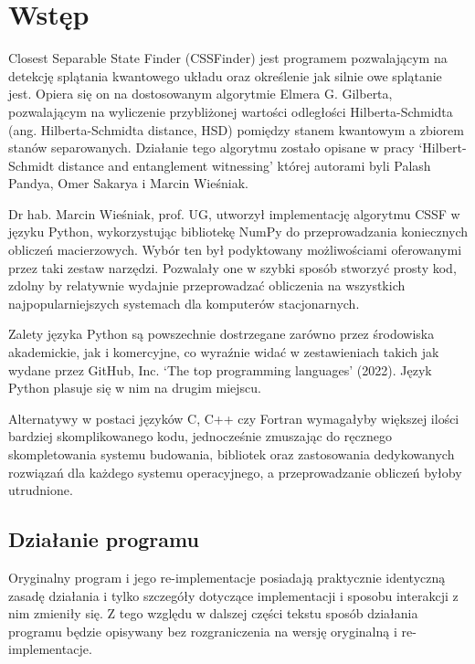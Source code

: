 \documentclass[11pt, a4paper]{article}
\begin{document}
  \begin{sloppypar}
    \section{Wstęp}
    Closest Separable State Finder (CSSFinder) jest programem pozwalającym na detekcję splątania
    kwantowego układu oraz określenie jak silnie owe splątanie jest. Opiera się on na
    dostosowanym algorytmie Elmera G. Gilberta\cite{Lindemann_Gilbert}, pozwalającym na wyliczenie
    przybliżonej wartości odległości Hilberta-Schmidta (ang. Hilberta-Schmidta distance,
    HSD) pomiędzy stanem kwantowym a zbiorem stanów separowanych. Działanie tego
    algorytmu zostało opisane w pracy `Hilbert-Schmidt distance and entanglement witnessing'
    której autorami byli Palash Pandya, Omer Sakarya i Marcin Wieśniak\cite{MW_Hilbert_Schmidt_distance}.

    Dr hab. Marcin Wieśniak, prof. UG, utworzył implementację algorytmu CSSF w języku
    Python, wykorzystując bibliotekę NumPy do przeprowadzania koniecznych obliczeń macierzowych.
    Wybór ten był podyktowany możliwościami oferowanymi przez taki zestaw narzędzi. Pozwalały
    one w szybki sposób stworzyć prosty kod, zdolny by relatywnie wydajnie przeprowadzać
    obliczenia na wszystkich najpopularniejszych systemach dla komputerów stacjonarnych.

    Zalety języka Python są powszechnie dostrzegane zarówno przez środowiska akademickie,
    jak i komercyjne, co wyraźnie widać w zestawieniach takich jak wydane przez GitHub, Inc.
    `The top programming languages' (2022)\cite{GitHub_Top_languages}. Język Python
    plasuje się w nim na drugim miejscu.

    Alternatywy w postaci języków C, C++ czy Fortran wymagałyby większej ilości bardziej
    skomplikowanego kodu, jednocześnie zmuszając do ręcznego skompletowania systemu
    budowania, bibliotek oraz zastosowania dedykowanych rozwiązań dla każdego systemu operacyjnego,
    a przeprowadzanie obliczeń byłoby utrudnione.

    \subsection{Działanie programu}


    Oryginalny program i jego re-implementacje posiadają praktycznie identyczną zasadę
    działania i tylko szczegóły dotyczące implementacji i sposobu interakcji z nim
    zmieniły się. Z tego względu w dalszej części tekstu sposób działania programu będzie
    opisywany bez rozgraniczenia na wersję oryginalną i re-implementacje.


\end{sloppypar}
\end{document}
